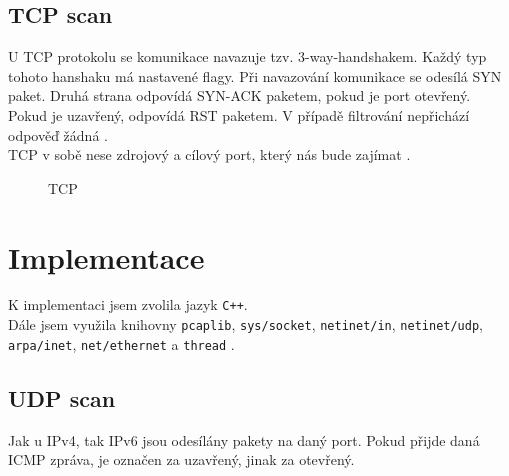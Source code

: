 \documentclass[11pt, a4paper]{article}
\begin{document}
\subsection{TCP scan}
U TCP protokolu se komunikace navazuje tzv. 3-way-handshakem. Každý typ tohoto hanshaku má nastavené flagy. Při navazování komunikace se odesílá SYN paket. Druhá strana odpovídá SYN-ACK paketem, pokud je port otevřený. Pokud je uzavřený, odpovídá RST paketem. V případě filtrování nepřichází odpověď žádná \cite{wikiScanner}.\\

TCP v sobě nese zdrojový a cílový port, který nás bude zajímat \cite{tcp}. 

\begin{figure}[ht]
	\begin{center}
	\caption{TCP}
	\end{center}
\end{figure}


\section{Implementace}
K implementaci jsem zvolila jazyk \texttt{C++}. \\

Dále jsem využila knihovny \texttt{pcaplib}, \texttt{sys/socket}, \texttt{netinet/in}, \texttt{netinet/udp}, \texttt{arpa/inet}, \texttt{net/ethernet} a \texttt{thread} .

\subsection{UDP scan}
Jak u IPv4, tak IPv6 jsou odesílány pakety na daný port. Pokud přijde daná ICMP zpráva, je označen za uzavřený, jinak za otevřený.\\
\end{document}
